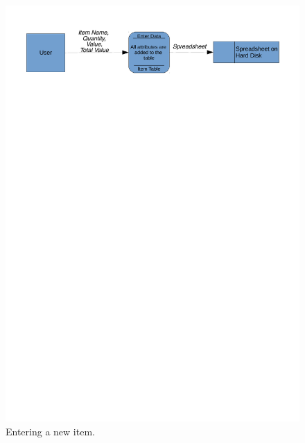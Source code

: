 \begin{center}
    \begin{figure}[H]
        \centerline{\includegraphics[width=\textwidth]{./Analysis/Dataflow/Old_System/Old_Sys_DFD_analysis_new_item.pdf}}
        \caption{Entering a new item.} \label{fig:print_function_result}
    \end{figure}


\end{center}
